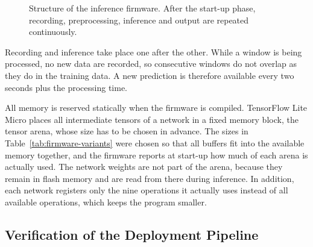 \begin{figure}[htbp]
\centering
{}
\caption{Structure of the inference firmware. After the start-up phase, recording,
preprocessing, inference and output are repeated continuously.}
\label{fig:inference-loop}
\end{figure}

Recording and inference take place one after the other. While a window is being
processed, no new data are recorded, so consecutive windows do not overlap as they
do in the training data. A new prediction is therefore available every two seconds
plus the processing time.

All memory is reserved statically when the firmware is compiled. TensorFlow Lite
Micro places all intermediate tensors of a network in a fixed memory block, the
tensor arena, whose size has to be chosen in advance. The sizes in
Table~\ref{tab:firmware-variants} were chosen so that all buffers fit into the
available memory together, and the firmware reports at start-up how much of each
arena is actually used. The network weights are not part of the arena, because
they remain in flash memory and are read from there during inference. In
addition, each network registers only the nine operations it actually uses
instead of all available operations, which keeps the program smaller.

\subsection{Verification of the Deployment Pipeline}
\label{sec:device-verification}

